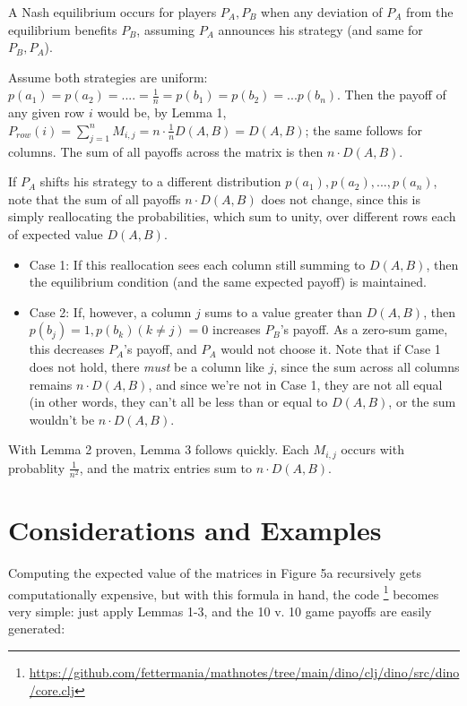 \documentclass[11pt, oneside]{article} 	%
\begin{document}
A Nash equilibrium occurs for players $P_A, P_B$ when any deviation of $P_A$ from the equilibrium benefits $P_B$, assuming $P_A$ announces his strategy (and same for $P_B, P_A$).

Assume both strategies are uniform: $p(a_1) = p(a_2) = .... = \frac{1}{n} = p(b_1) = p(b_2) = ... p(b_n)$.  Then the payoff of any given row $i$ would be, by Lemma 1, $P_{row}(i) = \sum_{j=1}^n M_{i,j} = n \cdot \frac{1}{n} D(A,B) = D(A,B)$; the same follows for columns.  The sum of all payoffs across the matrix is then $n \cdot D(A,B)$.

If $P_A$ shifts his strategy to a different distribution $p(a_1), p(a_2), ..., p(a_n)$, note that the sum of all payoffs $n\cdot D(A,B)$ does not change, since this is simply reallocating the probabilities, which sum to unity, over different rows each of expected value $D(A,B)$. 

\begin{itemize}
\item Case 1: If this reallocation sees each column still summing to $D(A,B)$, then the equilibrium condition (and the same expected payoff) is maintained.  
\item Case 2: If, however, a column $j$ sums to a value greater than $D(A,B)$, then $p(b_j) = 1, p(b_k) (k \neq j) = 0$ increases $P_B$'s payoff.  As a zero-sum game, this decreases $P_A$'s payoff, and $P_A$ would not choose it.  Note that if Case 1 does not hold, there \emph{must} be a column like $j$, since the sum across all columns remains $n \cdot D(A,B)$, and since we're not in Case 1, they are not all equal (in other words, they can't all be less than or equal to $D(A,B)$, or the sum wouldn't be $n \cdot D(A,B)$.
\end{itemize}


With Lemma 2 proven, Lemma 3 follows quickly.  Each $M_{i,j}$ occurs with probablity $\frac{1}{n^2}$, and the matrix entries sum to $n \cdot D(A,B)$.




\section{Considerations and Examples}

Computing the expected value of the matrices in Figure 5a recursively gets computationally expensive, but with this formula in hand, the code \footnote{\url{https://github.com/fettermania/mathnotes/tree/main/dino/clj/dino/src/dino/core.clj}} becomes very simple: just apply Lemmas 1-3, and the 10 v. 10 game payoffs are easily generated:
\end{document}
